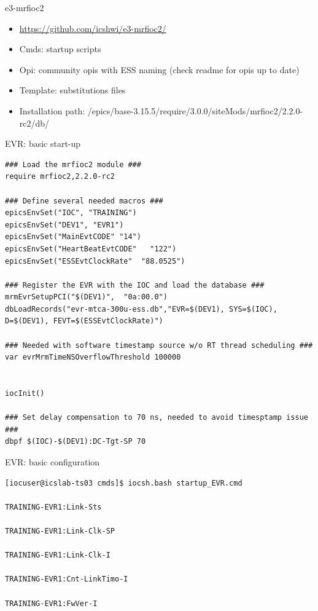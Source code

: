 \documentclass[
  9pt
  , table
  , ignorenonframetext
]{beamer}
\begin{document}
\begin{frame}{e3-mrfioc2}
  \begin{itemize}
    \item \url{https://github.com/icshwi/e3-mrfioc2/}
    \item Cmds: startup scripts
    \item Opi: community opis with ESS naming (check readme for opis up to date)
    \item Template: substitutions files
    \item Installation path: /epics/base-3.15.5/require/3.0.0/siteMods/mrfioc2/2.2.0-rc2/db/
  \end{itemize}
\end{frame}

\begin{frame}[fragile]{EVR: basic start-up}
\begin{lstlisting}[style=termstyle,breaklines=true,basicstyle=\scriptsize]
### Load the mrfioc2 module ###
require mrfioc2,2.2.0-rc2

### Define several needed macros ###
epicsEnvSet("IOC", "TRAINING")
epicsEnvSet("DEV1", "EVR1")
epicsEnvSet("MainEvtCODE" "14")
epicsEnvSet("HeartBeatEvtCODE"   "122")
epicsEnvSet("ESSEvtClockRate"  "88.0525")

### Register the EVR with the IOC and load the database ###
mrmEvrSetupPCI("$(DEV1)",  "0a:00.0")
dbLoadRecords("evr-mtca-300u-ess.db","EVR=$(DEV1), SYS=$(IOC), D=$(DEV1), FEVT=$(ESSEvtClockRate)")

### Needed with software timestamp source w/o RT thread scheduling ###
var evrMrmTimeNSOverflowThreshold 100000


iocInit()

### Set delay compensation to 70 ns, needed to avoid timesptamp issue ###
dbpf $(IOC)-$(DEV1):DC-Tgt-SP 70

\end{lstlisting}
\end{frame}

\begin{frame}[fragile]{EVR: basic configuration}
\begin{lstlisting}[style=termstyle,breaklines=true,basicstyle=\scriptsize]
[iocuser@icslab-ts03 cmds]$ iocsh.bash startup_EVR.cmd

TRAINING-EVR1:Link-Sts

TRAINING-EVR1:Link-Clk-SP

TRAINING-EVR1:Link-Clk-I

TRAINING-EVR1:Cnt-LinkTimo-I

TRAINING-EVR1:FwVer-I

\end{lstlisting}
\end{frame}
\end{document}
